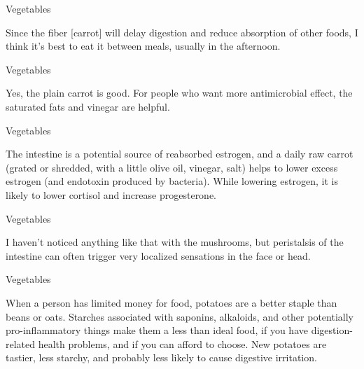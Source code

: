 \documentclass[11pt,oneside,openany,extrafontsizes]{memoir}
\begin{document}
\begin{standalonequote}{Vegetables}

    \begin{answer}
        Since the fiber [carrot] will delay digestion and reduce absorption of other foods, I think it's best to eat it between meals, usually in the afternoon.
    \end{answer}
\end{standalonequote}

\begin{standalonequote}{Vegetables}

    \begin{answer}
        Yes, the plain carrot is good. For people who want more antimicrobial effect, the saturated fats and vinegar are helpful.
    \end{answer}
\end{standalonequote}

\begin{standalonequote}{Vegetables}

    \begin{answer}
        The intestine is a potential source of reabsorbed estrogen, and a daily raw carrot (grated or shredded, with a little olive oil, vinegar, salt) helps to lower excess estrogen (and endotoxin produced by bacteria). While lowering estrogen, it is likely to lower cortisol and increase progesterone.
    \end{answer}
\end{standalonequote}

\begin{standalonequote}{Vegetables}

    \begin{answer}
        I haven't noticed anything like that with the mushrooms, but peristalsis of the intestine can often trigger very localized sensations in the face or head.
    \end{answer}
\end{standalonequote}

\begin{standalonequote}{Vegetables}

    \begin{answer}
        When a person has limited money for food, potatoes are a better staple than beans or oats. Starches associated with saponins, alkaloids, and other potentially pro-inflammatory things make them a less than ideal food, if you have digestion-related health problems, and if you can afford to choose. New potatoes are tastier, less starchy, and probably less likely to cause digestive irritation.
    \end{answer}
\end{standalonequote}
\end{document}
